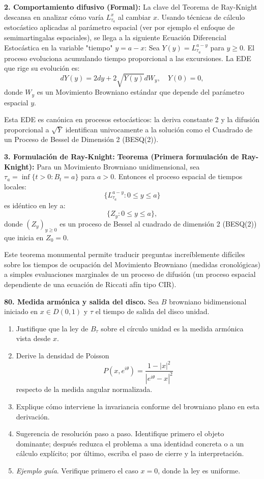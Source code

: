 \documentclass[11pt, letterpaper]{article}
\begin{document}
\begin{solucion}
    \textbf{2. Comportamiento difusivo (Formal):}
    La clave del Teorema de Ray-Knight descansa en analizar cómo varía $L_{\tau_a}^x$ al cambiar $x$. Usando técnicas de cálculo estocástico aplicadas al parámetro espacial (ver por ejemplo el enfoque de semimartingalas espaciales), se llega a la siguiente Ecuación Diferencial Estocástica en la variable "tiempo" $y = a - x$:
    Sea $Y(y) = L_{\tau_a}^{a-y}$ para $y \ge 0$.
    El proceso evoluciona acumulando tiempo proporcional a las excursiones. La EDE que rige su evolución es:
    \[ dY(y) = 2 dy + 2 \sqrt{Y(y)} dW_y, \quad Y(0) = 0, \]
    donde $W_y$ es un Movimiento Browniano estándar que depende del parámetro espacial $y$.
    
    Esta EDE es canónica en procesos estocásticos: la deriva constante 2 y la difusión proporcional a $\sqrt{Y}$ identifican univocamente a la solución como el Cuadrado de un Proceso de Bessel de Dimensión 2 (BESQ(2)).
    
    \textbf{3. Formulación de Ray-Knight:}
    \textbf{Teorema (Primera formulación de Ray-Knight):} Para un Movimiento Browniano unidimensional, sea $\tau_a = \inf\{t > 0 : B_t = a\}$ para $a > 0$. Entonces el proceso espacial de tiempos locales:
    \[ \{ L_{\tau_a}^{a-y} : 0 \le y \le a \} \]
    es idéntico en ley a:
    \[ \{ Z_y : 0 \le y \le a \}, \]
    donde $(Z_y)_{y \ge 0}$ es un proceso de Bessel al cuadrado de dimensión 2 (BESQ(2)) que inicia en $Z_0 = 0$.
    
    Este teorema monumental permite traducir preguntas increíblemente difíciles sobre los tiempos de ocupación del Movimiento Browniano (medidas cronológicas) a simples evaluaciones marginales de un proceso de difusión (un proceso espacial dependiente de una ecuación de Riccati afín tipo CIR).
\end{solucion}

\newpage

\begin{ejercicio}
    \textbf{80. Medida armónica y salida del disco.} Sea $B$ browniano bidimensional iniciado en $x\in D(0,1)$ y $\tau$ el tiempo de salida del disco unidad.
    \begin{enumerate}
        \item Justifique que la ley de $B_{\tau}$ sobre el círculo unidad es la medida armónica vista desde $x$.
        \item Derive la densidad de Poisson
        \[ P(x,e^{i\theta})=\frac{1-|x|^{2}}{|e^{i\theta}-x|^{2}} \]
        respecto de la medida angular normalizada.
        \item Explique cómo interviene la invariancia conforme del browniano plano en esta derivación.
        \item Sugerencia de resolución paso a paso. Identifique primero el objeto dominante; después reduzca el problema a una identidad concreta o a un cálculo explícito; por último, escriba el paso de cierre y la interpretación.
        \item \textit{Ejemplo guía}. Verifique primero el caso $x=0$, donde la ley es uniforme.
    \end{enumerate}
\end{ejercicio}
\end{document}
